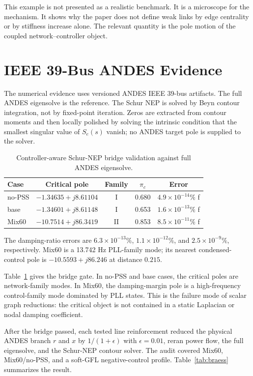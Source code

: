\documentclass[conference]{IEEEtran}
\begin{document}
This example is not presented as a realistic benchmark. It is a microscope for
the mechanism. It shows why the paper does not define weak links by edge
centrality or by stiffness increase alone. The relevant quantity is the pole
motion of the coupled network--controller object.

\section{IEEE 39-Bus ANDES Evidence}

The numerical evidence uses versioned ANDES IEEE 39-bus artifacts. The full ANDES eigensolve is the reference. The Schur NEP is solved by Beyn contour integration, not by fixed-point iteration. Zeros are extracted from contour moments and then locally polished by solving the intrinsic condition that the smallest singular value of $S_e(s)$ vanish; no ANDES target pole is supplied to the solver.

\begin{table}[t]
\caption{Controller-aware Schur-NEP bridge validation against full ANDES eigensolve.}
\label{tab:bridge}
\centering
\scriptsize
\begin{tabular}{lcccc}
\toprule
Case & Critical pole & Family & $\pi_c$ & Error\\
\midrule
no-PSS &
$-1.34635+j8.61104$ &
I & 0.680 &
$4.9{\times}10^{-14}\%$ f\\
base &
$-1.34601+j8.61148$ &
I & 0.653 &
$1.6{\times}10^{-13}\%$ f\\
Mix60 &
$-10.7514+j86.3419$ &
II & 0.853 &
$8.5{\times}10^{-11}\%$ f\\
\bottomrule
\end{tabular}
\vspace{1mm}

\raggedright
\footnotesize
The damping-ratio errors are $6.3{\times}10^{-13}\%$, $1.1{\times}10^{-12}\%$, and $2.5{\times}10^{-9}\%$, respectively. Mix60 is a 13.742 Hz PLL-family mode; its nearest condensed-control pole is $-10.5593+j86.246$ at distance $0.215$.
\end{table}

Table~\ref{tab:bridge} gives the bridge gate. In no-PSS and base cases, the critical poles are network-family modes. In Mix60, the damping-margin pole is a high-frequency control-family mode dominated by PLL states. This is the failure mode of scalar graph reductions: the critical object is not contained in a static Laplacian or nodal damping coefficient.

After the bridge passed, each tested line reinforcement reduced the physical ANDES branch $r$ and $x$ by $1/(1+\epsilon)$ with $\epsilon=0.01$, reran power flow, the full eigensolve, and the Schur-NEP contour solver. The audit covered Mix60, Mix60/no-PSS, and a soft-GFL negative-control profile. Table~\ref{tab:braess} summarizes the result.
\end{document}
